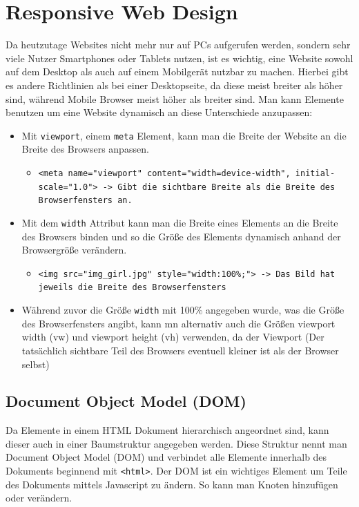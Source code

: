 \documentclass{article}
\begin{document}
	\section{Responsive Web Design}
	Da heutzutage Websites nicht mehr nur auf PCs aufgerufen werden, sondern sehr viele Nutzer Smartphones oder Tablets nutzen, ist es wichtig, eine Website sowohl auf dem Desktop als auch auf einem Mobilgerät nutzbar zu machen. Hierbei gibt es andere Richtlinien als bei einer Desktopseite, da diese meist breiter als höher sind, während Mobile Browser meist höher als breiter sind. Man kann Elemente benutzen um eine Website dynamisch an diese Unterschiede anzupassen:
	\begin{itemize}
		\item{Mit \texttt{viewport}, einem \texttt{meta} Element, kann man die Breite der Website an die Breite des Browsers anpassen.}
		\begin{itemize}
			\item{\texttt{<meta name="viewport" content="width=device-width", initial-scale="1.0"> -> Gibt die sichtbare Breite als die Breite des Browserfensters an.}}
		\end{itemize}
		\item{Mit dem \texttt{width} Attribut kann man die Breite eines Elements an die Breite des Browsers binden und so die Größe des Elements dynamisch anhand der Browsergröße verändern.}
		\begin{itemize}
			\item{\texttt{<img src="img_girl.jpg" style="width:100\%;"> -> Das Bild hat jeweils die Breite des Browserfensters}}
		\end{itemize}
		\item{Während zuvor die Größe \texttt{width} mit 100\% angegeben wurde, was die Größe des Browserfensters angibt, kann mn alternativ auch die Größen viewport width (vw) und viewport height (vh) verwenden, da der Viewport (Der tatsächlich sichtbare Teil des Browsers eventuell kleiner ist als der Browser selbst)}
	\end{itemize}
	\subsection{Document Object Model (DOM)}
	Da Elemente in einem HTML Dokument hierarchisch angeordnet sind, kann dieser auch in einer Baumstruktur angegeben werden. Diese Struktur nennt man Document Object Model (DOM) und verbindet alle Elemente innerhalb des Dokuments beginnend mit \texttt{<html>}. Der DOM ist ein wichtiges Element um Teile des Dokuments mittels Javascript zu ändern. So kann man Knoten hinzufügen oder verändern.
\end{document}
